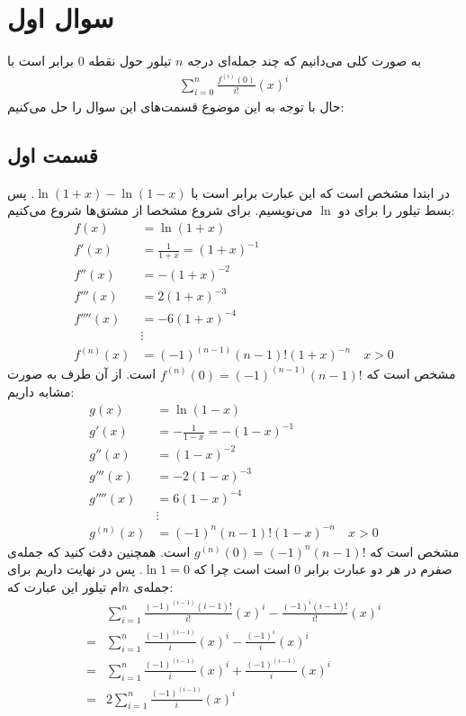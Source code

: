 \documentclass[]{article}
\begin{document}
\printheader

\section*{سوال اول}
به صورت کلی می‌دانیم که چند جمله‌ای درجه
$n$
تیلور حول نقطه 0 برابر است با
\begin{gather*}
    \sum_{i=0}^{n} \frac{f^{(i)}(0)}{i!}(x)^i
\end{gather*}
حال با توجه به این موضوع قسمت‌های این سوال را حل می‌کنیم:
\subsection*{قسمت اول}
در ابتدا مشخص است که این عبارت برابر است با $\ln(1 + x) - \ln(1 - x)$. پس بسط تیلور را برای دو $\ln$ می‌نویسیم. برای شروع مشخصا از مشتق‌ها شروع می‌کنیم:
\begin{align*}
    f(x) &= \ln(1 + x)\\
    f'(x) &= \frac{1}{1 + x} = (1 + x)^{-1}\\
    f''(x) &= -(1 + x)^{-2}\\
    f'''(x) &= 2(1 + x)^{-3}\\
    f''''(x) &= -6(1 + x)^{-4}\\
    &\vdots\\
    f^{(n)}(x) &= (-1)^{(n-1)} (n-1)! (1+x)^{-n} \quad x > 0
\end{align*}
مشخص است که
$f^{(n)}(0) = (-1)^{(n-1)} (n-1)!$
است. از آن طرف به صورت مشابه داریم:
\begin{align*}
    g(x) &= \ln(1 - x)\\
    g'(x) &= -\frac{1}{1 - x} = -(1 - x)^{-1}\\
    g''(x) &= (1 - x)^{-2}\\
    g'''(x) &= -2(1 - x)^{-3}\\
    g''''(x) &= 6(1 - x)^{-4}\\
    &\vdots\\
    g^{(n)}(x) &= (-1)^{n} (n-1)! (1-x)^{-n} \quad x > 0
\end{align*}
مشخص است که
$g^{(n)}(0) = (-1)^{n} (n-1)!$
است. همچنین دقت کنید که جمله‌ی صفرم در هر دو عبارت برابر 0 است
است چرا که $\ln 1 = 0$.
پس در نهایت داریم برای جمله‌ی
$n$ام
تیلور این عبارت که:
\begin{align*}
    &\sum_{i=1}^{n} \frac{(-1)^{(i-1)} (i-1)!}{i!}(x)^i - \frac{(-1)^{i} (i-1)!}{i!}(x)^i\\
    =&\sum_{i=1}^{n} \frac{(-1)^{(i-1)}}{i}(x)^i - \frac{(-1)^{i}}{i}(x)^i\\
    =&\sum_{i=1}^{n} \frac{(-1)^{(i-1)}}{i}(x)^i + \frac{(-1)^{(i-1)}}{i}(x)^i\\
    =&\boxed{2\sum_{i=1}^{n} \frac{(-1)^{(i-1)}}{i}(x)^i}
\end{align*}
\end{document}
